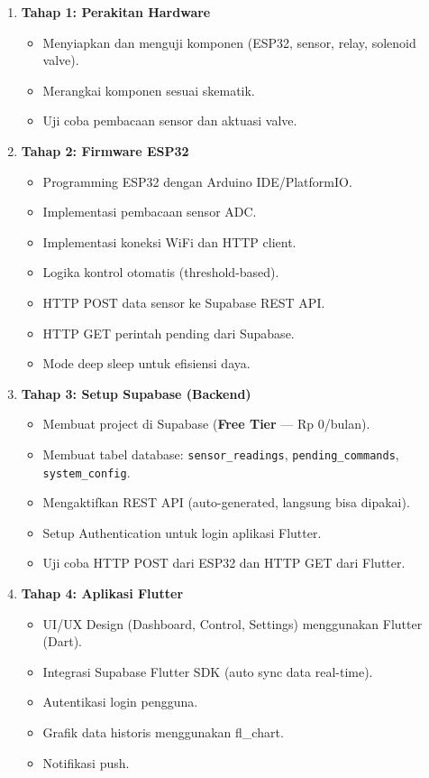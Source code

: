\documentclass[12pt,a4paper,oneside]{report}
\begin{document}
\begin{enumerate}
    \item \textbf{Tahap 1: Perakitan Hardware}
    \begin{itemize}
        \item Menyiapkan dan menguji komponen (ESP32, sensor, relay, solenoid valve).
        \item Merangkai komponen sesuai skematik.
        \item Uji coba pembacaan sensor dan aktuasi valve.
    \end{itemize}
    
    \item \textbf{Tahap 2: Firmware ESP32}
    \begin{itemize}
        \item Programming ESP32 dengan Arduino IDE/PlatformIO.
        \item Implementasi pembacaan sensor ADC.
        \item Implementasi koneksi WiFi dan HTTP client.
        \item Logika kontrol otomatis (threshold-based).
        \item HTTP POST data sensor ke Supabase REST API.
        \item HTTP GET perintah pending dari Supabase.
        \item Mode deep sleep untuk efisiensi daya.
    \end{itemize}
    
    \item \textbf{Tahap 3: Setup Supabase (Backend)}
    \begin{itemize}
        \item Membuat project di Supabase (\textbf{Free Tier} — Rp 0/bulan).
        \item Membuat tabel database: \texttt{sensor\_readings}, \texttt{pending\_commands}, \texttt{system\_config}.
        \item Mengaktifkan REST API (auto-generated, langsung bisa dipakai).
        \item Setup Authentication untuk login aplikasi Flutter.
        \item Uji coba HTTP POST dari ESP32 dan HTTP GET dari Flutter.
    \end{itemize}
    
    \item \textbf{Tahap 4: Aplikasi Flutter}
    \begin{itemize}
        \item UI/UX Design (Dashboard, Control, Settings) menggunakan Flutter (Dart).
        \item Integrasi Supabase Flutter SDK (auto sync data real-time).
        \item Autentikasi login pengguna.
        \item Grafik data historis menggunakan fl\_chart.
        \item Notifikasi push.
    \end{itemize}
\end{enumerate}
\end{document}
